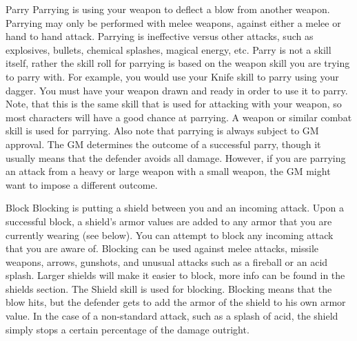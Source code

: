 \documentclass[twoside]{book}
\begin{document}
                
                 Parry   
                   Parrying is using your weapon to deflect a blow
                  from another weapon. Parrying may only be performed
                  with melee weapons, against either a melee or hand to
                  hand attack. Parrying is ineffective versus other
                  attacks, such as explosives, bullets, chemical
                  splashes, magical energy, etc. Parry is not a skill
                  itself, rather the skill roll for parrying is based on
                  the weapon skill you are trying to parry with. For
                  example, you would use your Knife skill to parry using
                  your dagger. You must have your weapon drawn and ready
                  in order to use it to parry. Note, that this is the
                  same skill that is used for attacking with your weapon,
                  so most characters will have a good chance at parrying.
                   A weapon or similar combat skill is used for
                   parrying. Also note that parrying is always subject to
                   GM approval. The GM determines the outcome of a
                   successful parry, though it usually means that the
                   defender avoids all damage. However, if you are
                   parrying an attack from a heavy or large weapon with a
                   small weapon, the GM might want to impose a different
                   outcome. 
                  
                
                
                 Block   
                   Blocking is putting a shield between you and an
                  incoming attack.
                    Upon a successful block, a shield's armor
                    values are added to any armor that you are currently
                    wearing   (see below). You can attempt to
                    block any incoming attack that you are aware of.
                    Blocking can be used against melee attacks, missile
                    weapons, arrows, gunshots, and unusual attacks such
                    as a fireball or an acid splash. Larger shields will
                    make it easier to block, more info can be found in
                    the shields section.
                    The Shield skill is used for blocking. Blocking
                    means that the blow hits, but the defender gets to
                    add the armor of the shield to his own armor value.
                      In the case of a non-standard attack, such
                    as a splash of acid, the shield simply stops a
                    certain percentage of the damage outright.
                  
\end{document}
